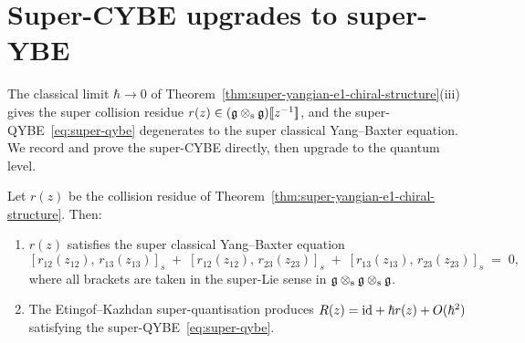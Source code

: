 \section{Super-CYBE upgrades to super-YBE}
\label{sec:super-ybe}

The classical limit $\hbar\to 0$ of
Theorem~\ref{thm:super-yangian-e1-chiral-structure}(iii) gives the
super collision residue $r(z)\in(\mathfrak{g}\mathbin{\otimes_{\mathrm{s}}}\mathfrak{g})[\![z^{-1}]\!]$, and
the super-QYBE~\eqref{eq:super-qybe} degenerates to the super classical
Yang--Baxter equation. We record and prove the super-CYBE directly,
then upgrade to the quantum level.

\begin{theorem}
\label{thm:super-ybe-from-super-cybe}
Let $r(z)$ be the collision residue of
Theorem~\ref{thm:super-yangian-e1-chiral-structure}. Then:
\begin{enumerate}[label=\textup{(\roman*)}]
\item $r(z)$ satisfies the super classical Yang--Baxter equation
 \begin{equation}
 \label{eq:super-cybe}
 [r_{12}(z_{12}),\, r_{13}(z_{13})]_s
 \;+\; [r_{12}(z_{12}),\, r_{23}(z_{23})]_s
 \;+\; [r_{13}(z_{13}),\, r_{23}(z_{23})]_s \;=\; 0,
 \end{equation}
 where all brackets are taken in the super-Lie sense in
 $\mathfrak{g}\mathbin{\otimes_{\mathrm{s}}}\mathfrak{g}\mathbin{\otimes_{\mathrm{s}}}\mathfrak{g}$.
\item The Etingof--Kazhdan super-quantisation produces $R(z) = \mathrm{id} +
 \hbar r(z) + O(\hbar^2)$ satisfying the super-QYBE~\eqref{eq:super-qybe}.
\end{enumerate}
\end{theorem}

